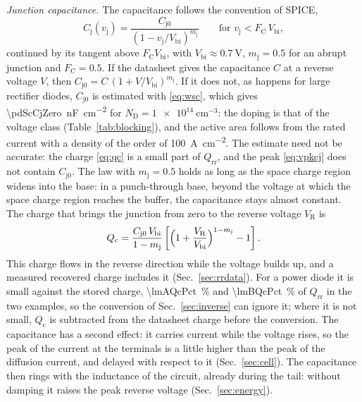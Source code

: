 \documentclass[10pt,a4paper]{scrartcl}
\newcommand{\VR}{V_\mathrm{R}}
\newcommand{\Qrr}{Q_\mathrm{rr}}
\newcommand{\vj}{v_\mathrm{j}}
\newcommand{\Cj}{C_\mathrm{j}}
\newcommand{\Cjo}{C_\mathrm{j0}}
\newcommand{\ND}{N_\mathrm{D}}
\newcommand{\Vbi}{V_\mathrm{bi}}
\begin{document}
\emph{Junction capacitance.} The capacitance follows the convention of SPICE,
\begin{equation}
\Cj(\vj) = \frac{\Cjo}{(1 - \vj/\Vbi)^{m_\mathrm{j}}} \qquad \text{for } \vj < F_\mathrm{C}\,\Vbi ,
\label{eq:cj}
\end{equation}
continued by its tangent above $F_\mathrm{C} \Vbi$, with $\Vbi \approx \SI{0.7}{\volt}$, $m_\mathrm{j} = 0.5$ for an abrupt junction and $F_\mathrm{C} = 0.5$. If the datasheet gives the capacitance $C$ at a reverse voltage $V$, then $\Cjo = C\,(1+V/\Vbi)^{m_\mathrm{j}}$. If it does not, as happens for large rectifier diodes, $\Cjo$ is estimated with \eqref{eq:wsc}, which gives \SI{\pdScCjZero}{\nano\farad\per\centi\metre\squared} for $\ND = \SI{1e14}{\centi\metre^{-3}}$: the doping is that of the voltage class (Table~\ref{tab:blocking}), and the active area follows from the rated current with a density of the order of \SI{100}{\ampere\per\centi\metre\squared}. The estimate need not be accurate: the charge \eqref{eq:qc} is a small part of $\Qrr$, and the peak \eqref{eq:vpkcj} does not contain $\Cjo$. The law with $m_\mathrm{j} = 0.5$ holds as long as the space charge region widens into the base: in a punch-through base, beyond the voltage at which the space charge region reaches the buffer, the capacitance stays almost constant. The charge that brings the junction from zero to the reverse voltage $\VR$ is
\begin{equation}
Q_\mathrm{c} = \frac{\Cjo\,\Vbi}{1-m_\mathrm{j}}\left[\Bigl(1+\frac{\VR}{\Vbi}\Bigr)^{1-m_\mathrm{j}} - 1\right] .
\label{eq:qc}
\end{equation}
This charge flows in the reverse direction while the voltage builds up, and a measured recovered charge includes it (Sec.~\ref{sec:rrdata}). For a power diode it is small against the stored charge, \SI{\lmAQcPct}{\percent} and \SI{\lmBQcPct}{\percent} of $\Qrr$ in the two examples, so the conversion of Sec.~\ref{sec:inverse} can ignore it; where it is not small, $Q_\mathrm{c}$ is subtracted from the datasheet charge before the conversion. The capacitance has a second effect: it carries current while the voltage rises, so the peak of the current at the terminals is a little higher than the peak of the diffusion current, and delayed with respect to it (Sec.~\ref{sec:cell}). The capacitance then rings with the inductance of the circuit, already during the tail: without damping it raises the peak reverse voltage (Sec.~\ref{sec:energy}).

\end{document}
